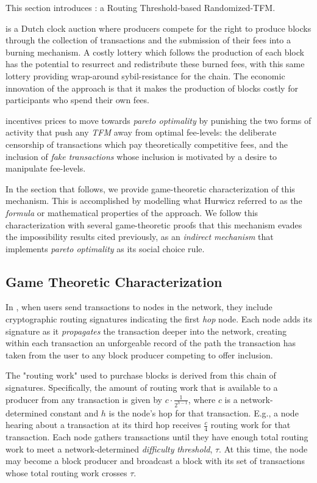 
This section introduces \ourTFM: a Routing Threshold-based Randomized-TFM.

\ourTFM is a Dutch clock auction where producers compete for the right to produce blocks through the collection of transactions and the submission of their fees into a burning mechanism. A costly lottery which follows the production of each block has the potential to resurrect and redistribute these burned fees, with this same lottery providing wrap-around sybil-resistance for the chain. The economic innovation of the approach is that it makes the production of blocks costly for participants who spend their own fees.

\ourTFM incentives prices to move towards \textit{pareto optimality} by punishing the two forms of activity that push any \textit{TFM} away from optimal fee-levels: the deliberate censorship of transactions which pay theoretically competitive fees, and the inclusion of \textit{fake transactions} whose inclusion is motivated by a desire to manipulate fee-levels.

In the section that follows, we provide game-theoretic characterization of this mechanism. This is accomplished by modelling what Hurwicz referred to as the \textit{formula} or mathematical properties of the approach. We follow this characterization with several game-theoretic proofs that this mechanism evades the impossibility results cited previously, as an \textit{indirect mechanism} that implements \textit{pareto optimality} as its social choice rule.

\subsection{Game Theoretic Characterization}

In \ourTFM, when users send transactions to nodes in the network, they include cryptographic routing signatures indicating the first \emph{hop} node. Each node adds its signature as it \emph{propagates} the transaction deeper into the network, creating within each transaction an unforgeable record of the path the transaction has taken from the user to any block producer competing to offer inclusion.

The "routing work" used to purchase blocks is derived from this chain of signatures. Specifically, the amount of routing work that is available to a producer from any transaction is given by $c\cdot \frac{1}{2^{h-1}}$, where $c$ is a network-determined constant and $h$ is the node's hop for that transaction. E.g., a node hearing about a transaction at its third hop receives $\frac{c}{4}$ routing work for that transaction. Each node gathers transactions until they have enough total routing work to meet a network-determined \textit{difficulty} \textit{threshold}, $\tau$. At this time, the node may become a block producer and broadcast a block with its set of transactions whose total routing work crosses $\tau$.

